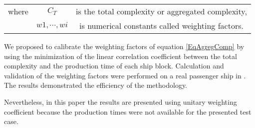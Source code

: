 \begin{tabular}{ l c c }
where   & $C_T$ & is the total complexity or aggregated complexity,\\
        & $w1, \cdots , wi$	& is numerical constants called weighting factors.
\end{tabular}

We proposed to calibrate the weighting factors of equation \ref{EqAgregComp} by using the minimization of the linear correlation coefficient between the total complexity and the production time of each ship block. Calculation and validation of the weighting factors were performed on a real passenger ship in \cite{CapraceCAD12}. The results demonstrated the efficiency of the methodology.

Nevertheless, in this paper the results are presented using unitary weighting coefficient because the production times were not available for the presented test case.

